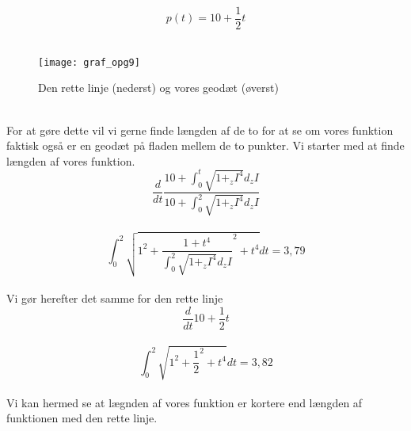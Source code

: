 $$p(t)=10+ \frac{1}{2}t $$ \\
\begin{figure}
  \caption{Den rette linje (nederst) og vores geodæt (øverst)}
  \centering
    \texttt{[image: graf\_opg9]}
\end{figure} \\
For at gøre dette vil vi gerne finde længden af de to for at se om vores funktion faktisk også er en geodæt på fladen mellem de to punkter. Vi starter med at finde længden af vores funktion. \\
$$ \frac{d}{dt} \frac{10+\int_{0}^{t}\sqrt{1+_zI^4}d_zI}{10+\int_{0}^{2}\sqrt{1+_zI^4}d_zI}$$ \\
$$ \int_{0}^{2}\sqrt{1^2+ \frac{1+t^4}{\int_{0}^{2}\sqrt{1+_zI^4}d_zI}^2+t^4}dt=3,79  $$\\
Vi gør herefter det samme for den rette linje \\
$$ \frac{d}{dt}10+ \frac{1}{2}t $$\\
$$\int_{0}^{2}\sqrt{1^2+\frac{1}{2}^2+t^4}dt=3,82 $$\\
Vi kan hermed se at lægnden af vores funktion er kortere end længden af funktionen med den rette linje.
